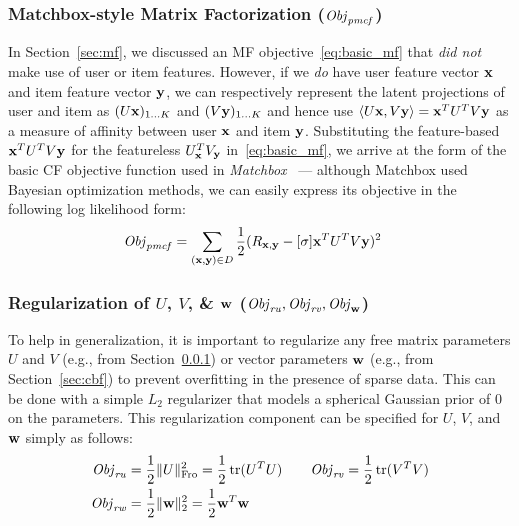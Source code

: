 \subsubsection{Matchbox-style Matrix Factorization ($\mathit{Obj}_{\mathit{pmcf}} $)}

\label{sec:matchbox_def}

In Section~\ref{sec:mf}, we discussed an MF objective~\eqref{eq:basic_mf}
that \emph{did not} make use of user or item features.  
However, if we \emph{do} have user feature vector $\mathbf{x}$ 
and item feature vector $\mathbf{y}$, we can respectively
represent the latent projections of user and item as $(U \mathbf{x})_{1 \ldots
K}$ and $(V \mathbf{y})_{1 \ldots K}$ and hence use $\langle U \mathbf{x}, V \mathbf{y} \rangle = \mathbf{x}^T
U^T V \mathbf{y}$ as a measure of affinity between user $\mathbf{x}$ and item $\mathbf{y}$.
Substituting the feature-based $\mathbf{x}^T U^T V \mathbf{y}$ for the featureless 
$U_{\mathbf{x}}^T V_{\mathbf{y}}$ in~\eqref{eq:basic_mf}, we arrive at the form of the basic CF 
objective function used in \emph{Matchbox}~\cite{matchbox} --- although
Matchbox used Bayesian optimization methods, we can easily express
its objective in the following log likelihood form:
\begin{align}
\mathit{Obj}_{\mathit{pmcf}} & = \sum_{(\mathbf{x},\mathbf{y}) \in D} \frac{1}{2} (R_{\mathbf{x},\mathbf{y}} - [\sigma] \mathbf{x}^T U^T V \mathbf{y})^2 \label{eq:matchbox_obj}
\end{align}

\subsubsection{Regularization of $U$, $V$, \& $\mathbf{w}$ ($\mathit{Obj}_{\mathit{ru}}, \mathit{Obj}_{\mathit{rv}}, \mathit{Obj}_{\mathbf{w}}$)}

To help in generalization, it is important to regularize any free
matrix parameters $U$ and $V$ (e.g., from
Section~\ref{sec:matchbox_def}) or vector parameters $\mathbf{w}$ (e.g., from
Section~\ref{sec:cbf}) to prevent overfitting in the presence of
sparse data. This can be done with a simple $L_2$ regularizer that
models a spherical Gaussian prior of $0$ on the parameters.  This
regularization component can be specified for $U$, $V$, and $\mathbf{w}$
simply as follows:
\begin{align}
\mathit{Obj}_{\mathit{ru}} & = \frac{1}{2} \| U \|_{\mathrm{Fro}}^2 = \frac{1}{2} \operatorname{tr}(U^T U) \qquad
\mathit{Obj}_{\mathit{rv}} = \frac{1}{2} \operatorname{tr}(V^T V) \nonumber \\
\mathit{Obj}_{\mathit{rw}} & = \frac{1}{2} \| \mathbf{w} \|_2^2 = \frac{1}{2} \mathbf{w}^T \mathbf{w} \label{eq:reg}
\end{align}

